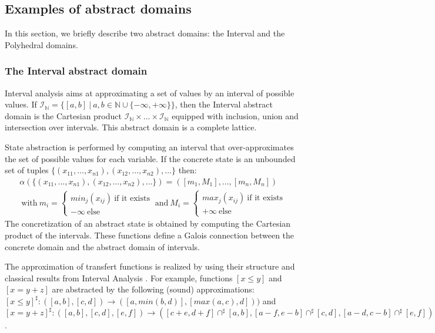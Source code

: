 \documentclass[submission,copyright,creativecommons]{eptcs}
\newcommand{\sh}[1]{\ensuremath{#1^\sharp}}
\begin{document}
\subsection{Examples of abstract domains}
\label{sec:ia:exemples}

In this section, we briefly describe two abstract domains:
the Interval \cite{CC76} and the Polyhedral \cite{CH78} domains. 

\subsubsection{The Interval abstract domain}
\label{intervals}
Interval analysis aims at approximating a set of values by an interval of possible values.
If $\mathcal{I}_{\mathbb{N}} = \{[a,b]~|~a,b \in \mathbb{N} \cup
\{-\infty, +\infty\}\}$, then the Interval abstract domain is the Cartesian product 
$\mathcal{I}_{\mathbb{N}} \times ... \times \mathcal{I}_{\mathbb{N}}$ equipped with
inclusion, union and intersection over intervals. This abstract domain is a complete lattice.

\noindent
State abstraction is performed by computing an interval that over-approximates the set of possible
values for each variable. If the concrete state is an unbounded set of tuples
$\{(x_{11},\ldots,x_{n1}),(x_{12},\ldots,x_{n2}),\ldots\}$ then:
\begin{multline*}
\alpha(\{(x_{11},\ldots,x_{n1}),(x_{12},\ldots,x_{n2}),\ldots\}) =
([m_1,M_1],\ldots,[m_n,M_n]) \\ ~\textrm{with}~m_i= \left\{ \begin{array}{ll} min_j(x_{ij})
  ~\textrm{if it exists} \\ -\infty~\textrm{else} \end{array} \right.~\textrm{and}~M_i = \left\{ \begin{array}{ll} max_j(x_{ij})
  ~\textrm{if it exists} \\ +\infty~\textrm{else} \end{array} \right.
\end{multline*}
The concretization of an abstract state is obtained by computing the Cartesian product of the intervals.
These functions define a Galois connection between the concrete domain and the abstract domain of intervals.

\noindent
The approximation of transfert functions is realized by using their structure and classical results from Interval Analysis \cite{Moo66}.
For example, functions $[x \leq y]$ and $[x=y+z]$ are abstracted by the following (sound) approximations:
$\sh{[x \leq y]}: ([a,b],[c,d]) \rightarrow ([a,min(b,d)],[max(a,c),d]))$ and 
$\sh{[x=y+z]}: ([a,b], [c,d], [e,f]) \rightarrow ([c+e,d+f] \sh{\cap} [a,b], [a-f,e-b] \sh{\cap} [c,d],[a-d, c-b] \sh{\cap} [e,f])$.    
\end{document}
